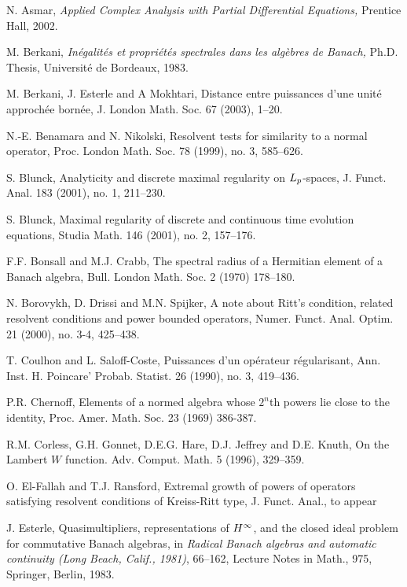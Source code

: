\documentclass[12pt]{amsart}
\begin{document}
\begin{thebibliography}{999}

N. Asmar, {\it Applied Complex Analysis with Partial Differential
Equations,} Prentice Hall, 2002.

M. Berkani,
{\it In\'egalit\'es et propri\'et\'es spectrales dans les alg\`ebres
de Banach,}  Ph.D. Thesis, Universit\'e de Bordeaux, 1983.

M. Berkani, J. Esterle and A Mokhtari, Distance entre puissances d'une
unit\'e approch\'ee born\'ee,
J. London Math. Soc. 67 (2003), 1--20.

N.-E. Benamara and N. Nikolski,
Resolvent tests for similarity to a normal operator,
Proc. London Math. Soc. 78 (1999), no. 3, 585--626.

S. Blunck,
Analyticity and discrete maximal regularity on $L\sb p$-spaces,
J. Funct. Anal.  183  (2001),  no. 1, 211--230.

S. Blunck,
Maximal regularity of discrete and continuous time evolution equations,
Studia Math.  146  (2001),  no. 2, 157--176.

F.F. Bonsall and M.J. Crabb,  The spectral radius of a Hermitian
element of a Banach algebra, Bull. London Math. Soc. 2 (1970)
178--180.

N. Borovykh, D. Drissi and M.N. Spijker,
A note about Ritt's condition, related resolvent conditions and power
bounded operators,
Numer. Funct. Anal. Optim.  21  (2000),  no. 3-4, 425--438.

T. Coulhon and L. Saloff-Coste,
Puissances d'un op\'erateur r\'egularisant,
Ann. Inst. H. Poincare' Probab. Statist.  26  (1990),  no. 3, 419--436.

 P.R. Chernoff, Elements of a normed algebra
whose $2^n$th powers lie close to the identity, Proc. Amer. Math.
Soc. 23 (1969) 386-387.

R.M. Corless, G.H. Gonnet, D.E.G. Hare, D.J. Jeffrey and D.E.
Knuth,  On the Lambert $W$ function. Adv. Comput. Math. 5 (1996),
 329--359.

O. El-Fallah and T.J. Ransford,
Extremal growth of powers of operators satisfying resolvent
conditions of Kreiss-Ritt type, J. Funct. Anal., to appear

J. Esterle,  Quasimultipliers, representations of $H\sp{\infty }$,
and the closed ideal problem for commutative Banach algebras, in
{\it Radical Banach algebras and automatic continuity (Long Beach,
Calif., 1981)}, 66--162, Lecture Notes in Math., 975, Springer,
Berlin, 1983.


\end{thebibliography}
\end{document}
